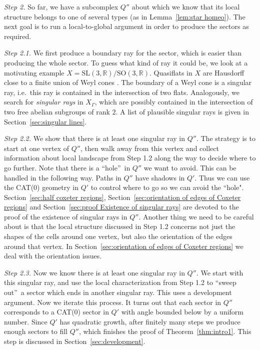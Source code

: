\documentclass[11pt]{amsart}
\theoremstyle{definition}
\begin{document}
\noindent
\emph{Step 2.} So far, we have a subcomplex $Q''$ about which we know that its local structure belongs to one of several types (as in Lemma~\ref{lem:star homeo}). The next goal is to run a local-to-global argument in order to produce the sectors as required. 
\medskip

\noindent
\emph{Step 2.1.} We first produce a boundary ray for the sector, which is easier than producing the whole sector. To guess what kind of ray it could be, we look at a motivating example $X=\mathrm{SL}(3,\mathbb R)/\mathrm{SO}(3,\mathbb R)$. Quasiflats in $X$ are Hausdorff close to a finite union of Weyl cones \cite{kleiner1997rigidity,eskin1997quasi}. The boundary of a Weyl cone is a singular ray, i.e.\ this ray is contained in the intersection of two flats. Analogously, we search for \emph{singular rays} in $X_\Gamma$, which are possibly contained in the intersection of two free abelian subgroups of rank $2$. A list of plausible singular rays is given in Section~\ref{sec:singular lines}.
\medskip

\noindent
\emph{Step 2.2.} We show that there is at least one singular ray in $Q''$. The strategy is to start at one vertex of $Q''$, then walk away from this vertex and collect information about local landscape from Step 1.2 along the way to decide where to go further. Note that there is a \textquotedblleft hole\textquotedblright\ in $Q''$ we want to avoid. This can be handled in the following way. Paths in $Q''$ have shadows in $Q'$. Thus we can use the CAT(0) geometry in $Q'$ to control where to go so we can avoid the ``hole". Section~\ref{sec:half coxeter regions}, Section~\ref{sec:orientation of edges of Coxeter regions} and Section~\ref{sec:proof Existence of singular rays} are devoted to the proof of the existence of singular rays in $Q''$. Another thing we need to be careful about is that the local structure discussed in Step 1.2 concerns not just the shapes of the cells around one vertex, but also the orientation of the edges around that vertex. In Section~\ref{sec:orientation of edges of Coxeter regions} we deal with the orientation issues. 
\medskip

\noindent
\emph{Step 2.3.} Now we know there is at least one singular ray in $Q''$. We start with this singular ray, and use the local characterization from Step 1.2 to \textquotedblleft sweep out\textquotedblright\ a sector which ends in another singular ray. This uses a development argument. Now we iterate this process. It turns out that each sector in $Q''$ corresponds to a CAT(0) sector in $Q'$ with angle bounded below by a uniform number. Since $Q'$ has quadratic growth, after finitely many steps we produce enough sectors to fill $Q''$, which finishes the proof of Theorem~\ref{thm:intro1}. This step is discussed in Section~\ref{sec:development}.
\medskip
\end{document}
